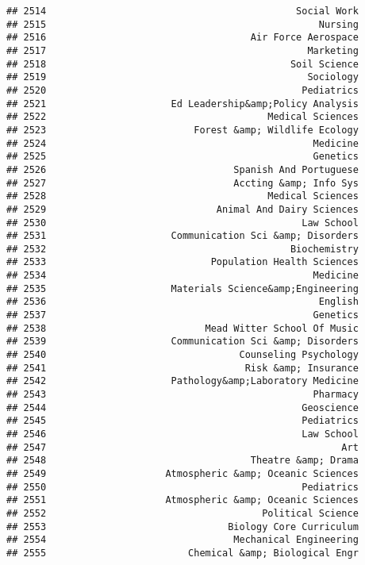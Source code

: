 \documentclass[
]{article}
\begin{document}
\begin{verbatim}
## 2514                                            Social Work
## 2515                                                Nursing
## 2516                                    Air Force Aerospace
## 2517                                              Marketing
## 2518                                           Soil Science
## 2519                                              Sociology
## 2520                                             Pediatrics
## 2521                      Ed Leadership&amp;Policy Analysis
## 2522                                       Medical Sciences
## 2523                          Forest &amp; Wildlife Ecology
## 2524                                               Medicine
## 2525                                               Genetics
## 2526                                 Spanish And Portuguese
## 2527                                 Accting &amp; Info Sys
## 2528                                       Medical Sciences
## 2529                              Animal And Dairy Sciences
## 2530                                             Law School
## 2531                      Communication Sci &amp; Disorders
## 2532                                           Biochemistry
## 2533                             Population Health Sciences
## 2534                                               Medicine
## 2535                      Materials Science&amp;Engineering
## 2536                                                English
## 2537                                               Genetics
## 2538                            Mead Witter School Of Music
## 2539                      Communication Sci &amp; Disorders
## 2540                                  Counseling Psychology
## 2541                                   Risk &amp; Insurance
## 2542                      Pathology&amp;Laboratory Medicine
## 2543                                               Pharmacy
## 2544                                             Geoscience
## 2545                                             Pediatrics
## 2546                                             Law School
## 2547                                                    Art
## 2548                                    Theatre &amp; Drama
## 2549                     Atmospheric &amp; Oceanic Sciences
## 2550                                             Pediatrics
## 2551                     Atmospheric &amp; Oceanic Sciences
## 2552                                      Political Science
## 2553                                Biology Core Curriculum
## 2554                                 Mechanical Engineering
## 2555                         Chemical &amp; Biological Engr

\end{verbatim}
\end{document}
